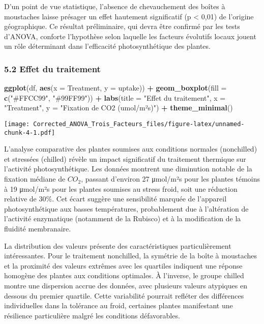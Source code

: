 \documentclass[
]{article}
\newenvironment{Shaded}{\begin{snugshade}}{\end{snugshade}}
\newcommand{\AttributeTok}[1]{\textcolor[rgb]{0.13,0.29,0.53}{#1}}
\newcommand{\FunctionTok}[1]{\textcolor[rgb]{0.13,0.29,0.53}{\textbf{#1}}}
\newcommand{\NormalTok}[1]{#1}
\newcommand{\SpecialCharTok}[1]{\textcolor[rgb]{0.81,0.36,0.00}{\textbf{#1}}}
\newcommand{\StringTok}[1]{\textcolor[rgb]{0.31,0.60,0.02}{#1}}
\begin{document}
D'un point de vue statistique, l'absence de chevauchement des boîtes à
moustaches laisse présager un effet hautement significatif (p
\textless{} 0,01) de l'origine géographique. Ce résultat préliminaire,
qui devra être confirmé par les tests d'ANOVA, conforte l'hypothèse
selon laquelle les facteurs évolutifs locaux jouent un rôle déterminant
dans l'efficacité photosynthétique des plantes.

\subsubsection{5.2 Effet du traitement}\label{effet-du-traitement}

\begin{Shaded}
\begin{Highlighting}[]
\FunctionTok{ggplot}\NormalTok{(df, }\FunctionTok{aes}\NormalTok{(}\AttributeTok{x =}\NormalTok{ Treatment, }\AttributeTok{y =}\NormalTok{ uptake)) }\SpecialCharTok{+} 
  \FunctionTok{geom\_boxplot}\NormalTok{(}\AttributeTok{fill =} \FunctionTok{c}\NormalTok{(}\StringTok{"\#FFCC99"}\NormalTok{, }\StringTok{"\#99FF99"}\NormalTok{)) }\SpecialCharTok{+}
  \FunctionTok{labs}\NormalTok{(}\AttributeTok{title =} \StringTok{"Effet du traitement"}\NormalTok{,}
       \AttributeTok{x =} \StringTok{"Treatment"}\NormalTok{, }\AttributeTok{y =} \StringTok{"Fixation de CO2 (umol/m²s)"}\NormalTok{) }\SpecialCharTok{+}
  \FunctionTok{theme\_minimal}\NormalTok{()}
\end{Highlighting}
\end{Shaded}

\texttt{[image: Corrected\_ANOVA\_Trois\_Facteurs\_files/figure-latex/unnamed-chunk-4-1.pdf]}

L'analyse comparative des plantes soumises aux conditions normales
(nonchilled) et stressées (chilled) révèle un impact significatif du
traitement thermique sur l'activité photosynthétique. Les données
montrent une diminution notable de la fixation médiane de \(CO_2\),
passant d'environ 27 μmol/m²s pour les plantes témoins à 19 μmol/m²s
pour les plantes soumises au stress froid, soit une réduction relative
de 30\%. Cet écart suggère une sensibilité marquée de l'appareil
photosynthétique aux basses températures, probablement due à
l'altération de l'activité enzymatique (notamment de la Rubisco) et à la
modification de la fluidité membranaire.

La distribution des valeurs présente des caractéristiques
particulièrement intéressantes. Pour le traitement nonchilled, la
symétrie de la boîte à moustaches et la proximité des valeurs extrêmes
avec les quartiles indiquent une réponse homogène des plantes aux
conditions optimales. À l'inverse, le groupe chilled montre une
dispersion accrue des données, avec plusieurs valeurs atypiques en
dessous du premier quartile. Cette variabilité pourrait refléter des
différences individuelles dans la tolérance au froid, certaines plantes
manifestant une résilience particulière malgré les conditions
défavorables.
\end{document}
